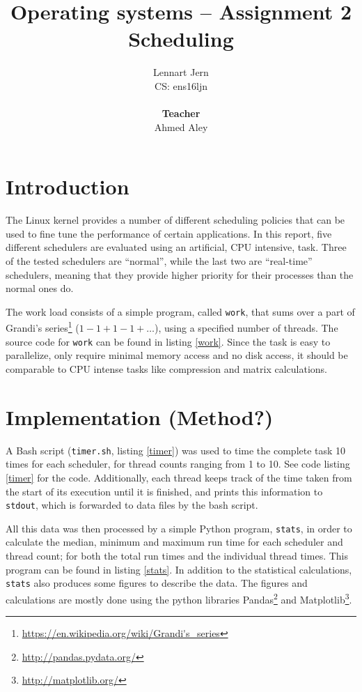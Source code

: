 \documentclass[12pt, a4paper]{article} %
\title{Operating systems -- Assignment 2\\Scheduling}
\author{Lennart Jern\\
	CS: ens16ljn\\ \\ \textbf{Teacher}\\ Ahmed Aley}
\begin{document}
\maketitle

\newpage


\section{Introduction}

The Linux kernel provides a number of different scheduling policies that can be used to fine tune the performance of certain applications.
In this report, five different schedulers are evaluated using an artificial, CPU intensive, task.
Three of the tested schedulers are ``normal'', while the last two are ``real-time'' schedulers, meaning that they provide higher priority for their processes than the normal ones do.

The work load consists of a simple program, called \texttt{work}, that sums over a part of Grandi's series\footnote{\url{https://en.wikipedia.org/wiki/Grandi's_series}} ($1-1+1-1+\dots$), using a specified number of threads.
The source code for \texttt{work} can be found in listing \ref{work}.
Since the task is easy to parallelize, only require minimal memory access and no disk access, it should be comparable to CPU intense tasks like compression and matrix calculations.

\section{Implementation (Method?)}

A Bash script (\texttt{timer.sh}, listing \ref{timer}) was used to time the complete task 10 times for each scheduler, for thread counts ranging from 1 to 10.
See code listing \ref{timer} for the code.
Additionally, each thread keeps track of the time taken from the start of its execution until it is finished, and prints this information to \texttt{stdout}, which is forwarded to data files by the bash script.

All this data was then processed by a simple Python program, \texttt{stats}, in order to calculate the median, minimum and maximum run time for each scheduler and thread count; for both the total run times and the individual thread times.
This program can be found in listing \ref{stats}.
In addition to the statistical calculations, \texttt{stats} also produces some figures to describe the data.
The figures and calculations are mostly done using the python libraries Pandas\footnote{\url{http://pandas.pydata.org/}} and Matplotlib\footnote{\url{http://matplotlib.org/}}.
\end{document}
